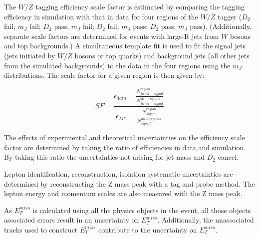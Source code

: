 The $W/Z$ tagging efficiency scale factor is estimated by comparing the tagging efficiency in simulation with that in data for four regions of the $W/Z$ tagger ($D_{2}$ fail, $m_{J}$ fail; $D_{2}$ pass, $m_{J}$ fail; $D_{2}$ fail, $m_{J}$ pass; $D_{2}$ pass, $m_{J}$ pass). (Additionally, separate scale factors are determined for events with large-R jets from $W$ bosons and top backgrounds.) A simultaneous template fit is used to fit the signal jets (jets initiated by $W/Z$ bosons or top quarks) and background jets (all other jets from the simulated backgrounds) to the data in the four regions using the $m_{J}$ distributions. The scale factor for a given region is then given by:

\begin{equation}
SF = \frac{ \epsilon_{data} = \frac{ N^{region}_{fitted-signal }}{N^{all-regions}_{fitted-signal}}}    {  \epsilon_{MC} = \frac{N^{region}_{signal}}{N^{all-regions}_{signal}}}  
\end{equation}
 
The effects of experimental and theoretical uncertainties on the efficiency scale factor are determined by taking the ratio of efficiencies in data and simulation. By taking this ratio the uncertainties not arising for jet mass and $D_{2}$ cancel. 

Lepton identification, reconstruction, isolation systematic uncertainties are determined by reconstructing the Z mass peak with a tag and probe method. The lepton energy and momentum scales are also measured with the Z mass peak.

As $E_{T}^{miss}$ is calculated using all the physics objects in the event, all those objects associated errors result in an uncertainty on $E_{T}^{miss}$. Additionally, the unassociated tracks used to construct $E_{T}^{miss}$ contribute to the uncertainty on $E_{T}^{miss}$. 


